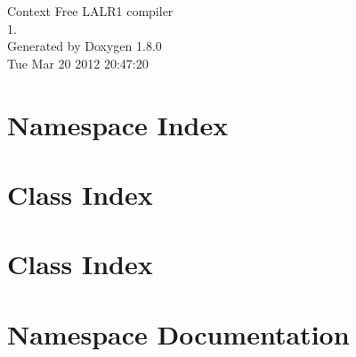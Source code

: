 \documentclass{book}
\begin{document}
\hypersetup{pageanchor=false,citecolor=blue}
\begin{titlepage}
\vspace*{7cm}
\begin{center}
{\Large Context Free L\-A\-L\-R1 compiler \\[1ex]\large 1. }\\
\vspace*{1cm}
{\large Generated by Doxygen 1.8.0}\\
\vspace*{0.5cm}
{\small Tue Mar 20 2012 20:47:20}\\
\end{center}
\end{titlepage}
\clearemptydoublepage
{}
\tableofcontents
\clearemptydoublepage
{}
\hypersetup{pageanchor=true,citecolor=blue}
\chapter{Namespace Index}

\chapter{Class Index}

\chapter{Class Index}

\chapter{Namespace Documentation}




\end{document}
